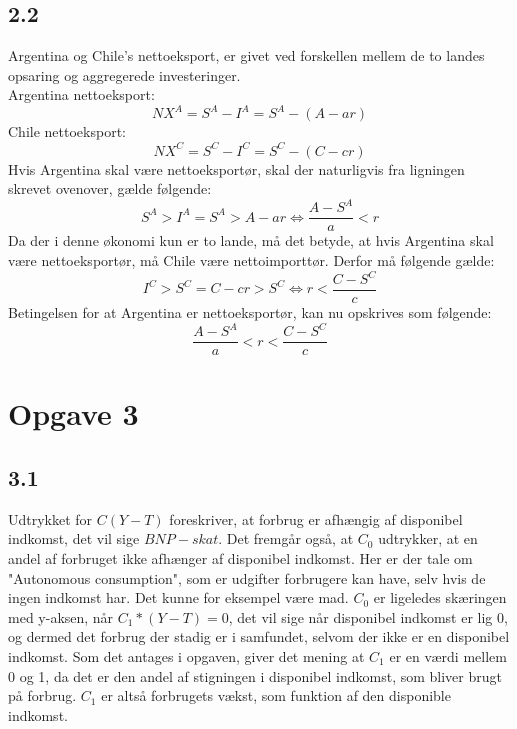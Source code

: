 \documentclass{article}
\begin{document}
\subsection*{2.2}
Argentina og Chile's nettoeksport, er givet ved forskellen mellem de to landes opsaring og aggregerede investeringer.
\\
Argentina nettoeksport:
\begin{equation}
    N X^A=S^A-I^A=S^A-(A-a r)
\end{equation}
Chile nettoeksport:
\begin{equation}
    N X^C=S^C-I^C=S^C-(C-c r)
\end{equation}
Hvis Argentina skal være nettoeksportør, skal der naturligvis fra ligningen skrevet ovenover, gælde følgende:
\begin{equation}
    S^A>I^A=S^A>A-a r \Leftrightarrow \frac{A-S^A}{a}<r
\end{equation}
Da der i denne økonomi kun er to lande, må det betyde, at hvis Argentina skal være nettoeksportør, må Chile være nettoimporttør. Derfor må følgende gælde:
\begin{equation}
    I^C>S^C=C-c r>S^C \Leftrightarrow r<\frac{C-S^C}{c}
\end{equation}
Betingelsen for at Argentina er nettoeksportør, kan nu opskrives som følgende:
\begin{equation}
    \frac{A-S^A}{a}<r<\frac{C-S^C}{c}
\end{equation}

\section*{Opgave 3}
\subsection*{3.1}
Udtrykket for $C(Y-T)$ foreskriver, at forbrug er afhængig af disponibel indkomst, det vil sige $BNP - skat$. Det fremgår også, at $C_0$ udtrykker, at en andel af forbruget ikke afhænger af disponibel indkomst. Her er der tale om "Autonomous consumption", som er udgifter forbrugere kan have, selv hvis de ingen indkomst har. Det kunne for eksempel være mad. $C_0$ er ligeledes skæringen med y-aksen, når $C_1*(Y-T) = 0$, det vil sige når disponibel indkomst er lig 0, og dermed det forbrug der stadig er i samfundet, selvom der ikke er en disponibel indkomst. Som det antages i opgaven, giver det mening at $C_1$ er en værdi mellem 0 og 1, da det er den andel af stigningen i disponibel indkomst, som bliver brugt på forbrug. $C_1$ er altså forbrugets vækst, som funktion af den disponible indkomst. 
\end{document}
